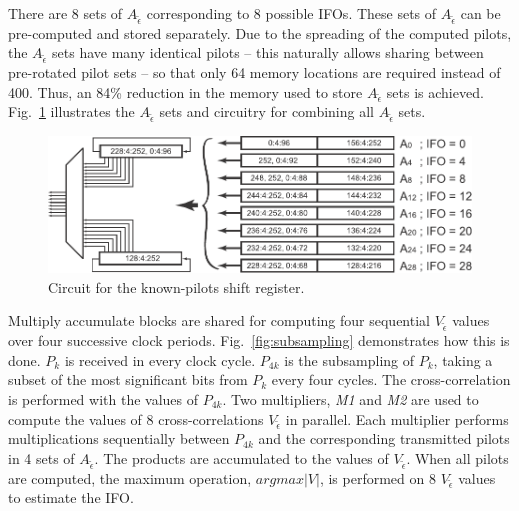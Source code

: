 There are 8 sets of $A_{\tilde{\epsilon}}$ corresponding to 8 possible IFOs.
These sets of $A_{\tilde{\epsilon}}$ can be pre-computed and stored separately.
Due to the spreading of the computed pilots, the $A_{\tilde{\epsilon}}$ sets have many identical pilots -- this naturally allows sharing between pre-rotated pilot sets -- so that only 64 memory locations are required instead of 400. Thus, an 84\% reduction in the memory used to store $A_{\tilde{\epsilon}}$ sets is achieved.
Fig.~\ref{fig:Pilots} illustrates the $A_{\tilde{\epsilon}}$ sets and circuitry for combining all $A_{\tilde{\epsilon}}$ sets.
\begin{figure}
	\centerline{\includegraphics [width=0.8\columnwidth] {figures/Pilots.pdf} }
	\caption{Circuit for the known-pilots shift register.}
	\label{fig:Pilots}
\end{figure}

Multiply accumulate blocks are shared for computing four sequential $V_{\tilde{\epsilon}}$ values over four successive clock periods. Fig.~\ref{fig:subsampling} demonstrates how this is done. $P_k$ is received in every clock cycle. $P_{4k}$ is the subsampling of $P_k$, taking a subset of the most significant bits from $P_k$ every four cycles. The cross-correlation is performed with the values of $P_{4k}$. Two multipliers, \emph{M1} and \emph{M2} are used to compute the values of 8 cross-correlations $V_{\tilde{\epsilon}}$ in parallel. Each multiplier performs multiplications sequentially between $P_{4k}$ and the corresponding transmitted pilots in 4 sets of $A_{\tilde{\epsilon}}$. The products are accumulated to the values of $V_{\tilde{\epsilon}}$. When all pilots are computed, the maximum operation, $argmax|V|$, is performed on 8 $V_{\tilde{\epsilon}}$ values to estimate the IFO.

